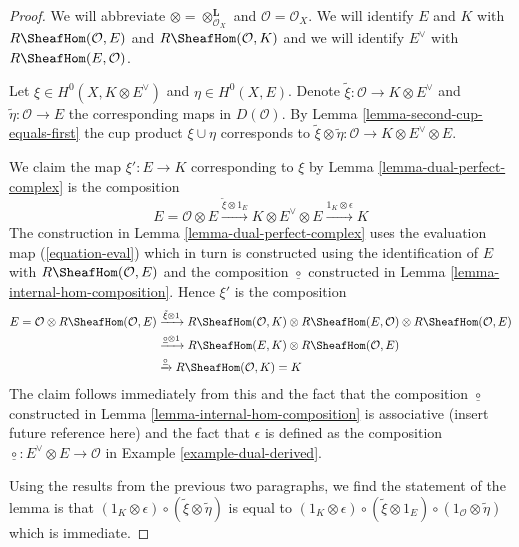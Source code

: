 \begin{proof}
We will abbreviate $\otimes = \otimes_{\mathcal{O}_X}^\mathbf{L}$
and $\mathcal{O} = \mathcal{O}_X$. We will identify $E$ and $K$
with $R\SheafHom(\mathcal{O}, E)$ and $R\SheafHom(\mathcal{O}, K)$
and we will identify $E^\vee$ with $R\SheafHom(E, \mathcal{O})$.

\medskip\noindent
Let $\xi \in H^0(X, K \otimes E^\vee)$ and $\eta \in H^0(X, E)$.
Denote $\tilde \xi : \mathcal{O} \to K \otimes E^\vee$ and
$\tilde \eta : \mathcal{O} \to E$ the corresponding maps in
$D(\mathcal{O})$. By Lemma \ref{lemma-second-cup-equals-first}
the cup product $\xi \cup \eta$ corresponds to
$\tilde \xi \otimes \tilde \eta : \mathcal{O} \to
K \otimes E^\vee \otimes E$.

\medskip\noindent
We claim the map $\xi' : E \to K$ corresponding to $\xi$ by
Lemma \ref{lemma-dual-perfect-complex} is the composition
$$
E = \mathcal{O} \otimes E
\xrightarrow{\tilde \xi \otimes 1_E}
K \otimes E^\vee \otimes E
\xrightarrow{1_K \otimes \epsilon}
K
$$
The construction in Lemma \ref{lemma-dual-perfect-complex}
uses the evaluation map (\ref{equation-eval}) which in turn
is constructed using the identification of $E$ with
$R\SheafHom(\mathcal{O}, E)$ and the composition
$\underline{\circ}$ constructed
in Lemma \ref{lemma-internal-hom-composition}.
Hence $\xi'$ is the composition
\begin{align*}
E = \mathcal{O} \otimes
R\SheafHom(\mathcal{O}, E)
& \xrightarrow{\tilde \xi \otimes 1}
R\SheafHom(\mathcal{O}, K) \otimes
R\SheafHom(E, \mathcal{O}) \otimes
R\SheafHom(\mathcal{O}, E) \\
& \xrightarrow{\underline{\circ} \otimes 1}
R\SheafHom(E, K) \otimes R\SheafHom(\mathcal{O}, E) \\
& \xrightarrow{\underline{\circ}}
R\SheafHom(\mathcal{O}, K) = K
\end{align*}
The claim follows immediately from this and the fact that
the composition $\underline{\circ}$ constructed in
Lemma \ref{lemma-internal-hom-composition} is associative
(insert future reference here) and the fact that $\epsilon$
is defined as the composition
$\underline{\circ} : E^\vee \otimes E \to \mathcal{O}$ in
Example \ref{example-dual-derived}.

\medskip\noindent
Using the results from the previous two paragraphs, we find
the statement of the lemma is that
$(1_K \otimes \epsilon) \circ (\tilde \xi \otimes \tilde \eta)$
is equal to
$(1_K \otimes \epsilon) \circ (\tilde \xi \otimes 1_E)
\circ (1_\mathcal{O} \otimes \tilde \eta)$
which is immediate.
\end{proof}

